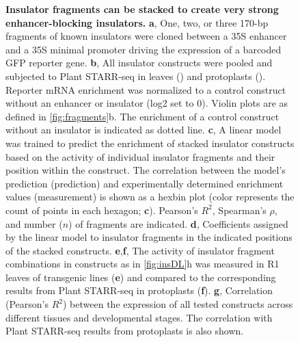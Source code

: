 \documentclass[10pt]{article}
\newcommand{\fignormal}{\scriptsize} %
\newcommand{\usename}[1]{\csname#1\endcsname}
\newif\ifnpc
\newcounter{fig}
\newenvironment{fig}{%
	\begin{figure}[p]%
		\stepcounter{fig}%
		\pdfbookmark{\figurename\ \thefig}{figure\thefig}
		\tikzsetnextfilename{figure\thefig}%
		\fignormal%
		\centering%
}{%
	\end{figure}%
	\clearpage%
	\ifnpc%
		\makenextpagecaption%
		\global\npcfalse%
	\fi%
}
\newcounter{efig}
\newcommand{\titleend}{ }
\newcommand{\nextentry}{ }
\newcommand{\captiontitle}[2][]{\textbf{#2.}\titleend}
\newif\ifsubfigupper
\newcounter{subfig}[figure]
\newcommand{\subfigrefsep}{,}
\newcommand{\subfigrefand}{,}
\newcommand{\subfigunformatted}[1]{\ifsubfigupper\uppercase{#1}\else\lowercase{#1}\fi}
\newcommand{\plainsubfigref}[1]{\textbf{\subfigunformatted{#1}}}
\newcommand{\subfig}[1]{\plainsubfigref{#1}\subfigrefsep}
\newcommand{\subfigtwo}[2]{\plainsubfigref{#1}\subfigrefand\plainsubfigref{#2}\subfigrefsep}
\newcommand{\parensubfig}[2][]{(#1\plainsubfigref{#2})}
\begin{document}
		\begin{fig}
			\caption{%
				\captiontitle{Insulator fragments can be stacked to create very strong enhancer-blocking insulators}%
				\subfig{A} One, two, or three 170-bp fragments of known insulators were cloned between a \usename{35S} enhancer and a 35S minimal promoter driving the expression of a barcoded GFP reporter gene.\nextentry
				\subfig{B} All insulator constructs were pooled and subjected to Plant STARR-seq in \tobacco leaves (\tobacco) and \maize protoplasts (\maize). Reporter mRNA enrichment was normalized to a control construct without an enhancer or insulator (log2 set to 0). Violin plots are as defined in \cref{fig:fragments}\subfigunformatted{B}. The enrichment of a control construct without an insulator is indicated as dotted line.\nextentry
				\subfig{C} A linear model was trained to predict the enrichment of stacked insulator constructs based on the activity of individual insulator fragments and their position within the construct. The correlation between the model's prediction (prediction) and experimentally determined enrichment values (measurement) is shown as a hexbin plot \parensubfig[color represents the count of points in each hexagon; ]{C}. Pearson's $R^2$, Spearman's $\rho$, and number ($n$) of fragments are indicated.\nextentry
				\subfig{D} Coefficients assigned by the linear model to insulator fragments in the indicated positions of the stacked constructs.\nextentry
				\subfigtwo{E}{F} The activity of insulator fragment combinations in constructs as in \cref{fig:insDL}\subfigunformatted{h} was measured in R1 leaves of transgenic \maize lines \parensubfig{E} and compared to the corresponding results from Plant STARR-seq in \maize protoplasts \parensubfig{F}.\nextentry
				\subfig{G} Correlation (Pearson's $R^2$) between the expression of all tested constructs across different tissues and developmental stages. The correlation with Plant STARR-seq results from \maize protoplasts is also shown.
			}%
			\label{fig:stacking}%
		\end{fig}
		
\end{document}
